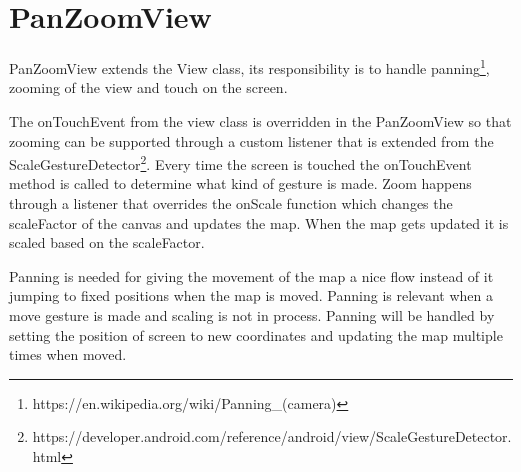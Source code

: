 \section{PanZoomView}

PanZoomView extends the View class, its responsibility is to handle panning\footnote{https://en.wikipedia.org/wiki/Panning\_(camera)}, zooming of the view and touch on the screen.

The onTouchEvent from the view class is overridden in the PanZoomView so that zooming can be supported through a custom listener that is extended from the ScaleGestureDetector\footnote{https://developer.android.com/reference/android/view/ScaleGestureDetector.html}. Every time the screen is touched the onTouchEvent method is called to determine what kind of gesture is made. Zoom happens through a listener that overrides the onScale function which changes the scaleFactor of the canvas and updates the map. When the map gets updated it is scaled based on the scaleFactor. 

Panning is needed for giving the movement of the map a nice flow instead of it jumping to fixed positions when the map is moved. Panning is relevant when a move gesture is made and scaling is not in process. Panning will be handled by setting the position of screen to new coordinates and updating the map multiple times when moved.